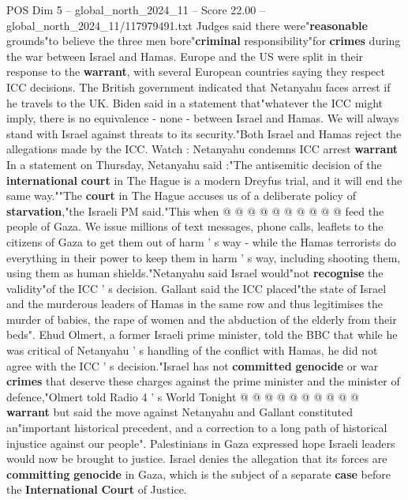 \begin{textsample}{POS Dim 5 – global\_north\_2024\_11 – Score 22.00 – global\_north\_2024\_11/117979491.txt}  \label{ex:f5_pos_034}
Judges said there were"\textbf{reasonable} grounds"to believe the three men bore"\textbf{criminal} responsibility"for \textbf{crimes} during the war between Israel and Hamas.
Europe and the US were split in their response to the \textbf{warrant}, with several European countries saying they respect ICC decisions.
The British government indicated that Netanyahu faces arrest if he travels to the UK.
Biden said in a statement that"whatever the ICC might imply, there is no equivalence - none - between Israel and Hamas.
We will always stand with Israel against threats to its security."Both Israel and Hamas reject the allegations made by the ICC.
Watch : Netanyahu condemns ICC arrest \textbf{warrant} In a statement on Thursday, Netanyahu said :"The antisemitic decision of the \textbf{international} \textbf{court} in The Hague is a modern Dreyfus trial, and it will end the same way.""The \textbf{court} in The Hague accuses us of a deliberate policy of \textbf{starvation},"the Israeli PM said."This when @ @ @ @ @ @ @ @ @ @ feed the people of Gaza.
We issue millions of text messages, phone calls, leaflets to the citizens of Gaza to get them out of harm ' s way - while the Hamas terrorists do everything in their power to keep them in harm ' s way, including shooting them, using them as human shields."Netanyahu said Israel would"not \textbf{recognise} the validity"of the ICC ' s decision.
Gallant said the ICC placed"the state of Israel and the murderous leaders of Hamas in the same row and thus legitimises the murder of babies, the rape of women and the abduction of the elderly from their beds".
Ehud Olmert, a former Israeli prime minister, told the BBC that while he was critical of Netanyahu ' s handling of the conflict with Hamas, he did not agree with the ICC ' s decision."Israel has not \textbf{committed} \textbf{genocide} or war \textbf{crimes} that deserve these charges against the prime minister and the minister of defence,"Olmert told Radio 4 ' s World Tonight @ @ @ @ @ @ @ @ @ @ \textbf{warrant} but said the move against Netanyahu and Gallant constituted an"important historical precedent, and a correction to a long path of historical injustice against our people".
Palestinians in Gaza expressed hope Israeli leaders would now be brought to justice.
Israel denies the allegation that its forces are \textbf{committing} \textbf{genocide} in Gaza, which is the subject of a separate \textbf{case} before the \textbf{International} \textbf{Court} of Justice.

\end{textsample}
